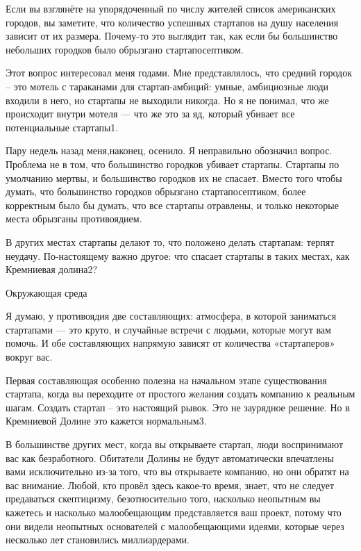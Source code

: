 \documentclass[ebook,12pt,oneside,openany]{memoir}
\begin{document}
\maketitle

Если вы взглянёте на упорядоченный по числу жителей список
американских городов, вы заметите, что количество успешных стартапов
на душу населения зависит от их размера. Почему-то это выглядит так,
как если бы большинство небольших городков было обрызгано
стартапосептиком.

Этот вопрос интересовал меня годами. Мне представлялось, что средний
городок – это мотель с тараканами для стартап-амбиций: умные,
амбициозные люди входили в него, но стартапы не выходили никогда. Но я
не понимал, что же происходит внутри мотеля — что же это за яд,
который убивает все потенциальные стартапы1.

Пару недель назад меня,наконец, осенило. Я неправильно обозначил
вопрос. Проблема не в том, что большинство городков убивает стартапы.
Стартапы по умолчанию мертвы, и большинство городков их не спасает.
Вместо того чтобы думать, что большинство городков обрызгано
стартапосептиком, более корректным было бы думать, что все стартапы
отравлены, и только некоторые места обрызганы противоядием.

В других местах стартапы делают то, что положено делать стартапам:
терпят неудачу. По-настоящему важно другое: что спасает стартапы в
таких местах, как Кремниевая долина2?

Окружающая среда

Я думаю, у противоядия две составляющих: атмосфера, в которой
заниматься стартапами — это круто, и случайные встречи с людьми,
которые могут вам помочь. И обе составляющих напрямую зависят от
количества «стартаперов» вокруг вас.

Первая составляющая особенно полезна на начальном этапе существования
стартапа, когда вы переходите от простого желания создать компанию к
реальным шагам. Создать стартап – это настоящий рывок. Это не
заурядное решение. Но в Кремниевой Долине это кажется нормальным3.

В большинстве других мест, когда вы открываете стартап, люди
воспринимают вас как безработного. Обитатели Долины не будут
автоматически впечатлены вами исключительно из-за того, что вы
открываете компанию, но они обратят на вас внимание. Любой, кто провёл
здесь какое-то время, знает, что не следует предаваться скептицизму,
безотносительно того, насколько неопытным вы кажетесь и насколько
малообещающим представляется ваш проект, потому что они видели
неопытных основателей с малообещающими идеями, которые через несколько
лет становились миллиардерами.
\end{document}
